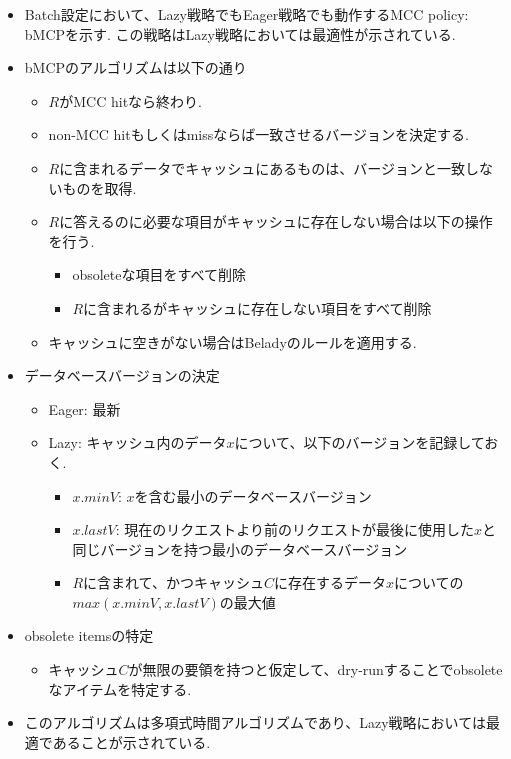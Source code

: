 \documentclass[dvipdfmx,uplatex]{jsarticle}
\theoremstyle{remark}
\newenvironment{method}[1]{
    \begin{tcolorbox}[
        colframe=green!50!black,
        colback=green!50!black!10!white,
        colbacktitle=green!50!black!40!white,
        coltitle=black,
        fonttitle=\bfseries,
        title={#1}
    ]
}{
    \end{tcolorbox}
}
\begin{document}
\begin{method}{Batch MCC Policy}
\begin{itemize}
    \item Batch設定において、Lazy戦略でもEager戦略でも動作するMCC policy: bMCPを示す. この戦略はLazy戦略においては最適性が示されている.
    \item bMCPのアルゴリズムは以下の通り
    \begin{itemize}
        \item $R$がMCC hitなら終わり.
        \item non-MCC hitもしくはmissならば一致させるバージョンを決定する.
        \item $R$に含まれるデータでキャッシュにあるものは、バージョンと一致しないものを取得.
        \item $R$に答えるのに必要な項目がキャッシュに存在しない場合は以下の操作を行う.
        \begin{itemize}
            \item obsoleteな項目をすべて削除
            \item $R$に含まれるがキャッシュに存在しない項目をすべて削除
        \end{itemize}
        \item キャッシュに空きがない場合はBeladyのルールを適用する.
    \end{itemize}
    \item データベースバージョンの決定
    \begin{itemize}
        \item Eager: 最新
        \item Lazy: キャッシュ内のデータ$x$について、以下のバージョンを記録しておく.
        \begin{itemize}
            \item $x.minV$: $x$を含む最小のデータベースバージョン
            \item $x.lastV$: 現在のリクエストより前のリクエストが最後に使用した$x$と同じバージョンを持つ最小のデータベースバージョン
            \item $R$に含まれて、かつキャッシュ$C$に存在するデータ$x$についての$max(x.minV, x.lastV)$の最大値
        \end{itemize}
    \end{itemize}
    \item obsolete itemsの特定
    \begin{itemize}
        \item キャッシュ$C$が無限の要領を持つと仮定して、dry-runすることでobsoleteなアイテムを特定する.
    \end{itemize}
    \item このアルゴリズムは多項式時間アルゴリズムであり、Lazy戦略においては最適であることが示されている.
\end{itemize}
\end{method}
\end{document}
